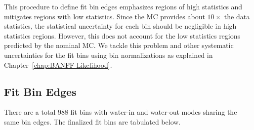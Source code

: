 This procedure to define fit bin edges emphasizes regions of high
statistics and mitigates regions with low statistics. Since the MC
provides about $10\times$ the data statistics, the statistical uncertainty
for each bin should be negligible in high statistics regions. However,
this does not account for the low statistics regions predicted by
the nominal MC. We tackle this problem and other systematic uncertainties
for the fit bins using bin normalizations as explained in \mbox{Chapter~\ref{chap:BANFF-Likelihood}}. 

\subsection{Fit Bin Edges}

There are a total 988 fit bins with water-in and water-out modes sharing
the same bin edges. The finalized fit bins are tabulated below.
